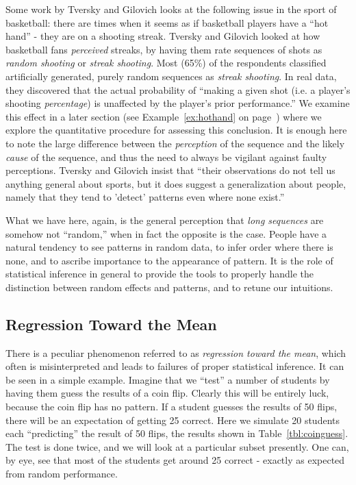 Some work by Tversky and Gilovich\cite{tversky2005cold} looks at the following issue in the sport of basketball:  there are times when it seems as if basketball players have a ``hot hand'' - they are on a shooting streak.  Tversky and Gilovich looked at how basketball fans {\em perceived} streaks, by having them rate sequences of shots as {\em random shooting} or {\em streak shooting}.  Most (65\%) of the respondents classified artificially generated, purely random sequences as {\em streak shooting}.  In real data, they discovered that the actual probability of ``making a given shot (i.e. a player's shooting {\em percentage}) is unaffected by the player's prior performance.''  We examine this effect in a later section (see Example~\ref{ex:hothand} on page~\pageref{ex:hothand}) where we explore the quantitative procedure for assessing this conclusion.  It is enough here to note the large difference between the {\em perception} of the sequence and the likely {\em cause} of the sequence, and thus the need to always be vigilant against faulty perceptions.  Tversky and Gilovich insist that ``their observations do not tell us anything general about sports, but it does suggest a generalization about people, namely that they tend to 'detect' patterns even where none exist.''

What we have here, again, is the general perception that {\em long sequences} are somehow not ``random,'' when in fact the opposite is the case.  People have a natural tendency to see patterns in random data, to infer order where there is none, and to ascribe importance to the appearance of pattern.  It is the role of statistical inference in general to provide the tools to properly handle the distinction between random effects and patterns, and to retune our intuitions.

\subsection{Regression Toward the Mean}
There is a peculiar phenomenon referred to as {\em regression toward the mean}, which often is misinterpreted and leads to failures of proper statistical inference.  It can be seen in a simple example.  Imagine that we ``test'' a number of students by having them guess the results of a coin flip.  Clearly this will be entirely luck, because the coin flip has no pattern.  If a student guesses the results of 50 flips, there will be an expectation of getting 25 correct.   Here we simulate 20 students each ``predicting'' the result of 50 flips, the results shown in Table~\ref{tbl:coinguess}.  The test is done twice, and we will look at a particular subset presently.  One can, by eye, see that most of the students get around 25 correct - exactly as expected from random performance.

